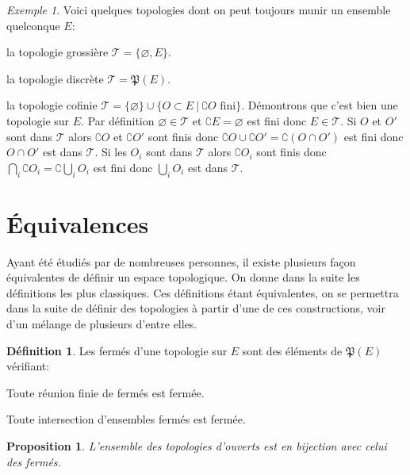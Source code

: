 \documentclass[a4paper, 11pt, french]{book}
\newenvironment{itemise}{\itemize}{\enditemize}
\theoremstyle{plain} %
\newtheorem{proposition}{Proposition}
\theoremstyle{definition} %
\newtheorem{definition}{Définition}
\theoremstyle{remark} %
\newtheorem{exemple}{Exemple}
\newcommand{\1}{\mathds{1}}
\newcommand\vide{\varnothing}
\begin{document}
\begin{exemple} Voici quelques topologies dont on peut toujours munir un ensemble quelconque $E$:
	\begin{itemise}
		\item la topologie grossière $\mathscr{T}=\{\vide, E\}$.
		\item la topologie discrète $\mathscr{T}=\mathfrak{P}(E)$.
		\item la topologie cofinie $\mathscr{T}=\{\vide\}\cup\{O\subset E\ |\ \complement O\text{ fini}\}$.
		Démontrons que c'est bien une topologie sur $E$.
		Par définition $\vide\in\mathscr{T}$ et $\complement E=\vide$ est fini donc $E\in\mathscr{T}$.
		Si $O$ et $O'$ sont dans $\mathscr{T}$ alors $\complement O$ et $\complement O'$ sont finis donc $\complement O\cup\complement O'=\complement(O\cap O')$ est fini donc $O\cap O'$ est dans $\mathscr{T}$.
		Si les $O_i$ sont dans $\mathscr{T}$ alors $\complement O_i$ sont finis donc $\bigcap_i\complement O_i=\complement\bigcup_iO_i$ est fini donc $\bigcup_iO_i$ est dans $\mathscr{T}$.
	\end{itemise}
\end{exemple}

\section{Équivalences}

Ayant été étudiés par de nombreuses personnes, il existe plusieurs façon équivalentes de définir un espace topologique.
On donne dans la suite les définitions les plus classiques.
Ces définitions étant équivalentes, on se permettra dans la suite de définir des topologies à partir d'une de ces constructions, voir d'un mélange de plusieurs d'entre elles.

\begin{definition}
	Les fermés d'une topologie sur $E$ sont des éléments de $\mathfrak{P}(E)$ vérifiant:
	\begin{itemise}
		\item Toute réunion finie de fermés est fermée.
		\item Toute intersection d'ensembles fermés est fermée.
	\end{itemise}
\end{definition}

\begin{proposition}
	L'ensemble des topologies d'ouverts est en bijection avec celui des fermés.
\end{proposition}
\end{document}
